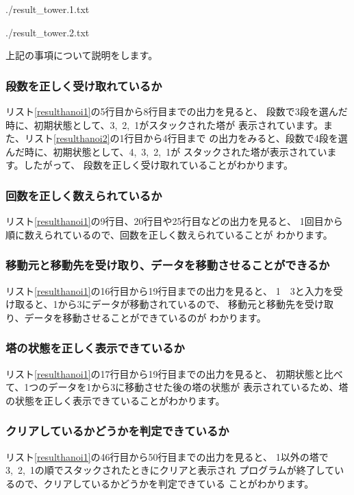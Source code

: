 \documentclass[a4j]{jarticle}
\begin{document}
\begin{lstinputlisting}[caption=ハノイプログラムの実行結果.1,label=resulthanoi1]{./result_tower.1.txt}
\end{lstinputlisting}

\begin{lstinputlisting}[caption=ハノイプログラムの実行結果.2,label=resulthanoi2]{./result_tower.2.txt}
\end{lstinputlisting}

上記の事項について説明をします。
\subsubsection{段数を正しく受け取れているか}
リスト\ref{resulthanoi1}の5行目から8行目までの出力を見ると、
段数で3段を選んだ時に、初期状態として、3,~2,~1がスタックされた塔が
表示されています。また、リスト\ref{resulthanoi2}の1行目から4行目まで
の出力をみると、段数で4段を選んだ時に、初期状態として、4,~3,~2,~1が
スタックされた塔が表示されています。したがって、
段数を正しく受け取れていることがわかります。
\subsubsection{回数を正しく数えられているか}
リスト\ref{resulthanoi1}の9行目、20行目や25行目などの出力を見ると、
1回目から順に数えられているので、回数を正しく数えられていることが
わかります。
\subsubsection{移動元と移動先を受け取り、データを移動させることができるか}
リスト\ref{resulthanoi1}の16行目から19行目までの出力を見ると、
1~~3と入力を受け取ると、1から3にデータが移動されているので、
移動元と移動先を受け取り、データを移動させることができているのが
わかります。
\subsubsection{塔の状態を正しく表示できているか}
リスト\ref{resulthanoi1}の17行目から19行目までの出力を見ると、
初期状態と比べて、1つのデータを1から3に移動させた後の塔の状態が
表示されているため、塔の状態を正しく表示できていることがわかります。
\subsubsection{クリアしているかどうかを判定できているか}
リスト\ref{resulthanoi1}の46行目から50行目までの出力を見ると、
1以外の塔で3,~2,~1の順でスタックされたときにクリアと表示され
プログラムが終了しているので、クリアしているかどうかを判定できている
ことがわかります。
\end{document}
